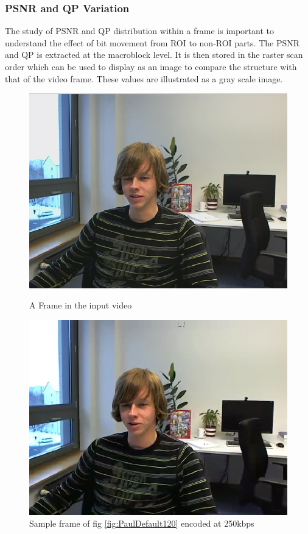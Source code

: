 \documentclass[11pt]{article} %
\begin{document}
\subsubsection{PSNR and QP Variation}
The study of PSNR and QP distribution within a frame is important to understand the effect of bit movement from ROI to non-ROI parts. The PSNR and QP is extracted at the macroblock level. It is then stored in the raster scan order which can be used to display as  an image to compare the structure with that of the video frame. These values are illustrated as a gray scale image. 

\begin{figure}[!h]
    \centering
    \includegraphics[scale=0.5]{PaulDefault120}
    \caption{A Frame in the input video}
    \label{fig:PaulDefault120}
    \includegraphics[scale=0.5]{PaulDefault120_91250kbps}
    \caption{Sample frame of fig \ref{fig:PaulDefault120} encoded at 250kbps}
    \label{fig:PaulDefaultencoded}
\end{figure} 
\end{document}
